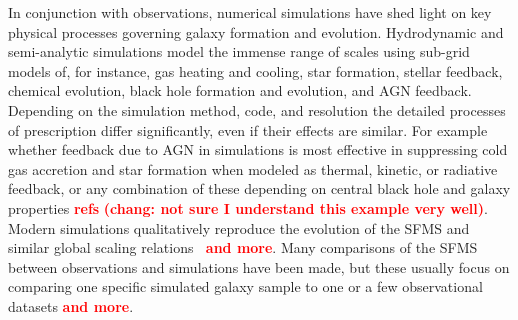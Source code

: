 \documentclass[preprint2,tighten]{aastex62}
\newcommand{\todo}[1]{{\bf \textcolor{red}{ #1}}}
\begin{document}
In conjunction with observations, numerical simulations have shed light
on key physical processes governing galaxy formation and evolution. 
Hydrodynamic and semi-analytic simulations model the immense range of 
scales using sub-grid models of, for instance, gas heating and cooling, 
star formation, stellar feedback, chemical evolution, black hole formation 
and evolution, and AGN feedback. Depending on the simulation method, code, 
and resolution the detailed processes of prescription differ significantly, 
even if their effects are similar. 
For example whether feedback due to AGN in simulations 
is most effective in suppressing cold gas accretion and star formation when
modeled as thermal, kinetic, or radiative feedback, or any combination of 
these depending on central black hole and galaxy properties \todo{refs} \todo{(chang: not sure I understand this example very well)}. 
Modern simulations qualitatively reproduce the evolution of the SFMS and 
similar global scaling 
relations~\citep{SomervilleDave2015ARAA, vogelsberger2014,genel2014, schaye2015, dave2016, dave2017}\todo{and more}. 
Many comparisons of the SFMS between observations and simulations have been made, but these usually focus on comparing one specific simulated galaxy sample to one or a few observational datasets \citep{vogelsberger2014,genel2014, schaye2015, dave2016,bluck2016, torrey2014,sparre2015}\todo{and more}.
\end{document}

